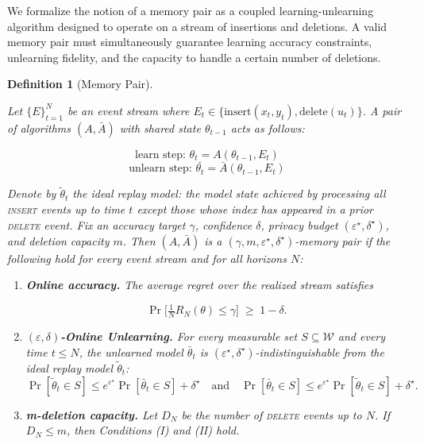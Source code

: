 \documentclass[a4paper,12pt]{article}
\newtheorem{definition}[theorem]{Definition}
\begin{document}
We formalize the notion of a memory pair as a coupled learning-unlearning algorithm designed to operate on a stream of insertions and deletions. A valid memory pair must simultaneously guarantee learning accuracy constraints, unlearning fidelity, and the capacity to handle a certain number of deletions.

\begin{definition}[Memory Pair]
\label{def:memory-pair}

Let $\{E\}_{t=1}^{N}$ be an event stream where $E_{t} \in \{\text{insert}(x_{t},y_{t}), \text{delete}(u_{t})\}$. A pair of algorithms $(A, \bar{A})$ with shared state $\theta_{t-1}$ acts as follows:

$$
\text{learn step: }\theta_t = A(\theta_{t-1},E_t) 
$$
$$
\text{unlearn step: } \bar{\theta_{t}} = \bar{A}(\theta_{t-1},E_{t})
$$

Denote by $\tilde \theta_{t}$ the ideal replay model: the model state achieved by processing all \textsc{insert} events up to time $t$ except those whose index has appeared in a prior \textsc{delete} event. Fix an accuracy target $\gamma$, confidence $\delta$, privacy budget $(\varepsilon^{\star},\delta^{\star})$, and deletion capacity $m$. Then $(A,\bar A)$ is a \emph{$(\gamma,m,\varepsilon^{\star},\delta^{\star})$-memory pair} if the following hold for every event stream and for all horizons $N$:

\begin{enumerate}
\item \textbf{Online accuracy.} The average regret over the realized stream satisfies

\[
\Pr\!\bigl[\tfrac{1}{N} R_N(\theta)\le\gamma\bigr] \;\ge\; 1-\delta.
\]

\item \textbf{$(\varepsilon,\delta)$-Online Unlearning.} For every measurable set $S\subseteq\mathcal W$ and every time $t\!\le\!N$, the unlearned model $\bar\theta_{t}$ is $(\varepsilon^{\star},\delta^{\star})$-indistinguishable from the ideal replay model $\tilde\theta_{t}$:
\[
    \Pr[\tilde\theta_t\in S] \le e^{\varepsilon^\star}\Pr[\bar\theta_t\in S]+\delta^\star \quad \text{and} \quad \Pr[\bar\theta_t\in S] \le e^{\varepsilon^\star}\Pr[\tilde\theta_t\in S]+\delta^\star.
\]

\item \textbf{m-deletion capacity.} Let $D_N$ be the number of \textsc{delete} events up to $N$. If $D_N\le m$, then Conditions (I) and (II) hold.

\end{enumerate}
\end{definition}
\end{document}
